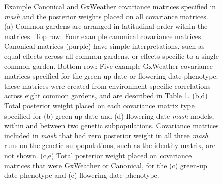\documentclass[
  9pt,
  twocolumn,
  twoside]{pnas-new}
\begin{document}
\begin{figure}


\caption{\label{fig-covar}Example Canonical and GxWeather covariance
matrices specified in \emph{mash} and the posterior weights placed on
all covariance matrices. (a) Common gardens are arranged in latitudinal
order within the matrices. Top row: Four example canonical covariance
matrices. Canonical matrices (purple) have simple interpretations, such
as equal effects across all common gardens, or effects specific to a
single common garden. Bottom row: Five example GxWeather covariance
matrices specified for the green-up date or flowering date phenotype;
these matrices were created from environment-specific correlations
across eight common gardens, and are described in Table 1. (b,d) Total
posterior weight placed on each covariance matrix type specified for (b)
green-up date and (d) flowering date \emph{mash} models, within and
between two genetic subpopulations. Covariance matrices included in
\emph{mash} that had zero posterior weight in all three \emph{mash} runs
on the genetic subpopulations, such as the identity matrix, are not
shown. (c,e) Total posterior weight placed on covariance matrices that
were GxWeather or Canonical, for the (c) green-up date phenotype and (e)
flowering date phenotype.}

\end{figure}%
\end{document}
